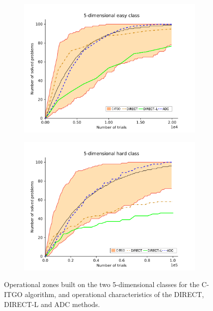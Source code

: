 \begin{figure}[h]
    \centering
    \begin{subfigure}{.5\textwidth}
      \centering
      \includegraphics[width=1.1\linewidth]{Imgs/fill_5E_edit}
      \caption{}
      \label{fig:OpCarac_a}
    \end{subfigure}%
    \begin{subfigure}{.5\textwidth}
      \centering
      \includegraphics[width=1.1\linewidth]{Imgs/fill_5H_edit}
      \caption{}
      \label{fig:OpCarac_b}
    \end{subfigure}
    \caption{Operational zones built on the two 5-dimensional classes for the C-ITGO algorithm, and operational characteristics of the DIRECT, DIRECT-L and ADC methods.}\label{fig:OpCarac}
\end{figure}


